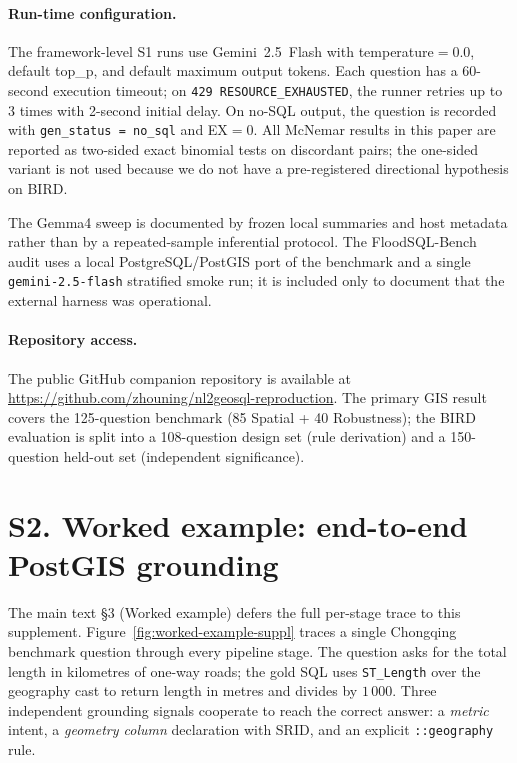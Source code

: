 \documentclass[11pt]{article}
\begin{document}
\paragraph{Run-time configuration.} The framework-level S1 runs use Gemini~2.5~Flash with
temperature$=0.0$, default top\_p, and default maximum output tokens. Each question
has a 60-second execution timeout; on \texttt{429 RESOURCE\_\allowbreak{}EXHAUSTED}, the runner
retries up to 3 times with 2-second initial delay. On no-SQL output, the question
is recorded with \texttt{gen\_status = no\_sql} and EX$=0$. All McNemar results
in this paper are reported as two-sided exact binomial tests on discordant pairs;
the one-sided variant is not used because we do not have a pre-registered
directional hypothesis on BIRD.

The Gemma4 sweep is documented by frozen local summaries and host metadata
rather than by a repeated-sample inferential protocol. The FloodSQL-\allowbreak{}Bench audit
uses a local PostgreSQL/\allowbreak{}PostGIS port of the benchmark and a single
\texttt{gemini-2.5-\allowbreak{}flash} stratified smoke run; it is included only to document
that the external harness was operational.

\paragraph{Repository access.} The public GitHub companion repository is
available at \url{https://github.com/zhouning/nl2geosql-reproduction}. The primary
GIS result covers the 125-question benchmark (85 Spatial + 40 Robustness); the
BIRD evaluation is split into a 108-question design set (rule derivation) and a
150-question held-out set (independent significance).

\section*{S2. Worked example: end-to-end PostGIS grounding}

The main text \S3 (Worked example) defers the full per-stage trace to this supplement. Figure~\ref{fig:worked-example-suppl} traces a single Chongqing benchmark question through every pipeline stage. The question asks for the total length in kilometres of one-way roads; the gold SQL uses \texttt{ST\_Length} over the geography cast to return length in metres and divides by $1\,000$. Three independent grounding signals cooperate to reach the correct answer: a \emph{metric} intent, a \emph{geometry column} declaration with SRID, and an explicit \texttt{::geography} rule.
\end{document}
